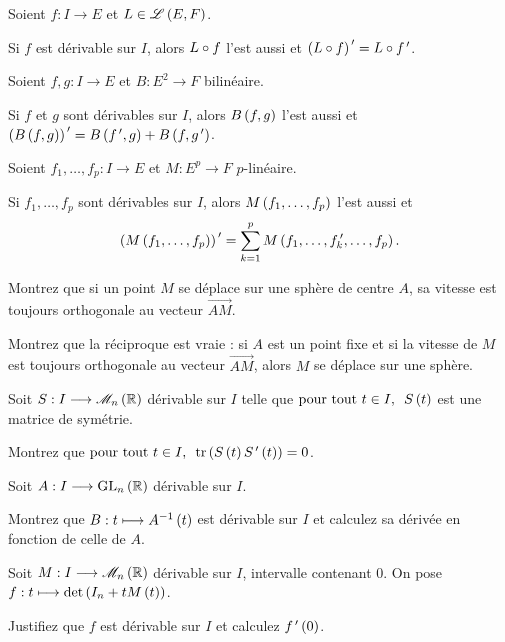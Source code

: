 \begin{prop}
Soient \(f:I\to E\) et \(L\in\mathscr{L}\left(E,F\right)\).

Si \(f\) est dérivable sur \(I\), alors \(L\circ f\) l'est aussi et \(\left(L\circ f\right)^{\,\prime}=L\circ f^{\,\prime}\).
\end{prop}

\begin{prop}
Soient \(f,g:I\to E\) et \(B:E^2\to F\) bilinéaire.

Si \(f\) et \(g\) sont dérivables sur \(I\), alors \(B\left(f,g\right)\) l'est aussi et \(\left(B\left(f,g\right)\right)^{\,\prime}=B\left(f^{\,\prime},g\right)+B\left(f,g^{\,\prime}\right)\).
\end{prop}

\begin{prop}
Soient \(f_1,\dots,f_p:I\to E\) et \(M:E^p\to F\) \(p\)-linéaire.

Si \(f_1,\dots,f_p\) sont dérivables sur \(I\), alors \(M\left(f_1,\dots,f_p\right)\) l'est aussi et \[\left(M\left(f_1,\dots,f_p\right)\right)^{\,\prime}=\sum_{k=1}^pM\left(f_1,\dots,f_k^{\,\prime},\dots,f_p\right).\]
\end{prop}

\begin{exo}
Montrez que si un point \(M\) se déplace sur une sphère de centre \(A\), sa vitesse est toujours orthogonale au vecteur \(\overrightarrow{AM}\).

Montrez que la réciproque est vraie : si \(A\) est un point fixe et si la vitesse de \(M\) est toujours orthogonale au vecteur \(\overrightarrow{AM}\), alors \(M\) se déplace sur une sphère.
\end{exo}

\begin{exo}
Soit \(S:I\to\M{n}[\R]\) dérivable sur \(I\) telle que \(\quantifs{\tpt t\in I}S\paren{t}\) est une matrice de symétrie.

Montrez que \(\quantifs{\tpt t\in I}\tr\paren{S\paren{t}S\prim\paren{t}}=0\).
\end{exo}

\begin{exo}
Soit \(A:I\to\GL{n}[\R]\) dérivable sur \(I\).

Montrez que \(B:t\longmapsto A^{-1}\left(t\right)\) est dérivable sur \(I\) et calculez sa dérivée en fonction de celle de \(A\).
\end{exo}

\begin{exo}
Soit \(M:I\to\M{n}[\R]\) dérivable sur \(I\), intervalle contenant \(0\). On pose \(f:t\longmapsto\det\left(I_n+tM\left(t\right)\right)\).

Justifiez que \(f\) est dérivable sur \(I\) et calculez \(f^{\,\prime}\left(0\right)\).
\end{exo}

